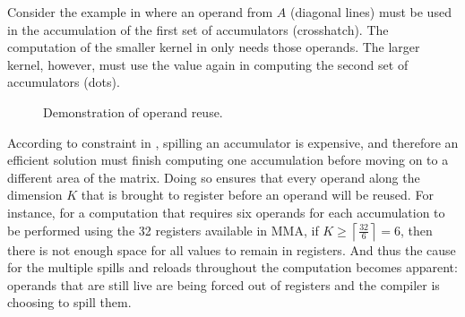 \documentclass[\main/thesis.tex]{subfiles}
\begin{document}
Consider the example in  where an operand from $A$ (diagonal lines) must be used in the accumulation of the first set of accumulators (crosshatch).
The computation of the smaller kernel in  only needs those operands.
The larger kernel, however, must use the value again in computing the second set of accumulators (dots).

\begin{figure}[t]
  \centering
  \caption{Demonstration of operand reuse.}
  \label{fig:opReuse}
\end{figure}

According to constraint  in , spilling an accumulator is expensive, and therefore an efficient solution must finish computing one accumulation before moving on to a different area of the matrix.
Doing so ensures that every operand along the dimension $K$ that is brought to register before an operand will be reused.
For instance, for a computation that requires six operands for each accumulation to be performed using the 32 registers available in MMA, if $K \geq \left\lceil \frac{32}{6} \right\rceil = 6$, then there is not enough space for all values to remain in registers\footnotemark.
And thus the cause for the multiple spills and reloads throughout the computation becomes apparent: operands that are still \gls{live} are being forced out of registers and the compiler is choosing to spill them.
\end{document}
